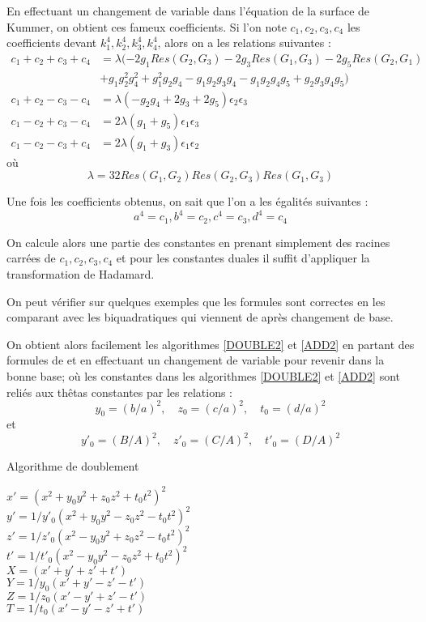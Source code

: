 \documentclass[a4paper]{article}
\theoremstyle{definition}
\theoremstyle{remark}
\numberwithin{equation}{section}
\begin{document}
En effectuant un changement de variable dans l'équation de la surface de Kummer, on obtient ces fameux coefficients. Si l'on note $c_1,c_2,c_3,c_4$ les coefficients devant $k_1^4,k_2^4,k_3^4,k_4^4$, alors on a les relations suivantes :
\begin{align*}
c_1+c_2+c_3+c_4 &= \lambda(-2g_1Res(G_2,G_3)-2g_3Res(G_1,G_3)-2g_5Res(G_2,G_1) \\
	&+ g_1g_2^2g_4^2 + g_1^2g_2g_4 - g_1g_2g_3g_4 - g_1g_2g_4g_5 + g_2g_3g_4g_5) \\
c_1+c_2-c_3-c_4 &= \lambda(-g_2g_4+2g_3+2g_5)\epsilon_2\epsilon_3 \\
c_1-c_2+c_3-c_4 &= 2\lambda(g_1+g_5)\epsilon_1\epsilon_3 \\
c_1-c_2-c_3+c_4 &= 2\lambda(g_1+g_3)\epsilon_1\epsilon_2
\end{align*}
où
$$\lambda = 32Res(G_1,G_2)Res(G_2,G_3)Res(G_1,G_3)$$

Une fois les coefficients obtenus, on sait que l'on a les égalités suivantes :
$$a^4 = c_1, b^4 = c_2, c^4 = c_3 , d^4 = c_4$$

On calcule alors une partie des constantes en prenant simplement des racines carrées de $c_1,c_2,c_3,c_4$ et pour les constantes duales il suffit d'appliquer la transformation de Hadamard.

On peut vérifier sur quelques exemples que les formules sont correctes en les comparant avec les biquadratiques qui viennent de \citep{cassels-Flynn} après changement de base.

On obtient alors facilement les algorithmes \ref{DOUBLE2} et \ref{ADD2} en partant des formules de \citep{gaudry} et en effectuant un changement de variable pour revenir dans la bonne base; où les constantes dans les algorithmes \ref{DOUBLE2} et \ref{ADD2} sont reliés aux thêtas constantes par les relations :
$$y_0 = (b/a)^2, \quad z_0 = (c/a)^2, \quad t_0 = (d/a)^2$$
et
$$y'_0 = (B/A)^2, \quad z'_0 = (C/A)^2, \quad t'_0 = (D/A)^2$$

\begin{algorithm}
\label{DOUBLE2}
\caption{Algorithme de doublement}
$x' = (x^2 + y_0y^2 + z_0z^2 + t_0t^2)^2$ \\
$y' = 1/y'_0(x^2 + y_0y^2 - z_0z^2 - t_0t^2)^2$ \\
$z' = 1/z'_0(x^2 - y_0y^2 + z_0z^2 - t_0t^2)^2$ \\
$t' = 1/t'_0(x^2 - y_0y^2 - z_0z^2 + t_0t^2)^2$ \\
$X = (x' + y' + z' + t')$ \\
$Y = 1/y_0(x' + y' - z' - t')$ \\
$Z = 1/z_0(x' - y' + z' - t')$ \\
$T = 1/t_0(x' - y' - z' + t')$ \\
\end{algorithm}
\end{document}
